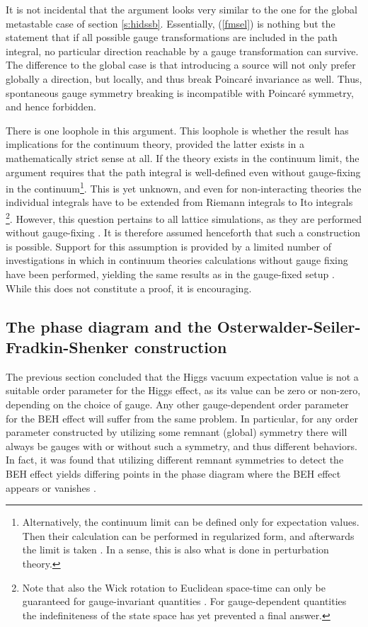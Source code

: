 \documentclass[final,twoside,12pt]{article}
\newcommand*{\pref}[1]{(\ref{#1})}
\newcommand*{\1}{1\!\!\!\bot}
\begin{document}
It is not incidental that the argument looks very similar to the one for the global metastable case of section \ref{s:hidssb}. Essentially, \pref{fmsel} is nothing but the statement that if all possible gauge transformations are included in the path integral, no particular direction reachable by a gauge transformation can survive. The difference to the global case is that introducing a source will not only prefer globally a direction, but locally, and thus break Poincar\'e invariance as well. Thus, spontaneous gauge symmetry breaking is incompatible with Poincar\'e symmetry, and hence forbidden.

There is one loophole in this argument. This loophole is whether the result has implications for the continuum theory, provided the latter exists in a mathematically strict sense at all. If the theory exists in the continuum limit, the argument requires that the path integral is well-defined even without gauge-fixing in the continuum\footnote{Alternatively, the continuum limit can be defined only for expectation values. Then their calculation can be performed in regularized form, and afterwards the limit is taken \cite{Seiler:1982pw}. In a sense, this is also what is done in perturbation theory.}. This is yet unknown, and even for non-interacting theories the individual integrals have to be extended from Riemann integrals to Ito integrals \cite{Rivers:1987hi}\footnote{Note that also the Wick rotation to Euclidean space-time can only be guaranteed for gauge-invariant quantities \cite{Seiler:1982pw}. For gauge-dependent quantities the indefiniteness of the state space has yet prevented a final answer.}. However, this question pertains to all lattice simulations, as they are performed without gauge-fixing \cite{Montvay:1994cy,Gattringer:2010zz,DeGrand:2006zz}. It is therefore assumed henceforth that such a construction is possible. Support for this assumption is provided by a limited number of investigations in which in continuum theories calculations without gauge fixing have been performed, yielding the same results as in the gauge-fixed setup \cite{Strocchi:1974xh,Arnone:2005fb,Arnone:2006ie,Rosten:2010vm}. While this does not constitute a proof, it is encouraging.

\subsection{The phase diagram and the Osterwalder-Seiler-Fradkin-Shenker construction}\label{ss:pd}

The previous section concluded that the Higgs vacuum expectation value is not a suitable order parameter for the Higgs effect, as its value can be zero or non-zero, depending on the choice of gauge. Any other gauge-dependent order parameter for the BEH effect will suffer from the same problem. In particular, for any order parameter constructed by utilizing some remnant (global) symmetry there will always be gauges with or without such a symmetry, and thus different behaviors. In fact, it was found that utilizing different remnant symmetries to detect the BEH effect yields differing points in the phase diagram where the BEH effect appears or vanishes \cite{Caudy:2007sf,Greensite:2008ss}.
\end{document}
